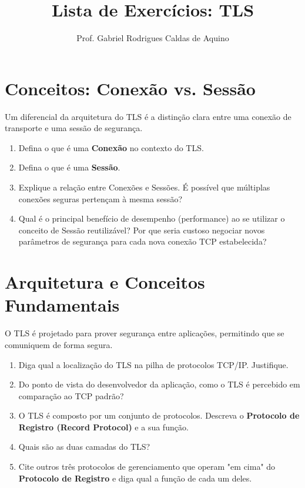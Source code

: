     \title{Lista de Exercícios: TLS}
        \author{Prof. Gabriel Rodrigues Caldas de Aquino}



\maketitle

\section{Conceitos: Conexão vs. Sessão}
Um diferencial da arquitetura do TLS é a distinção clara entre uma conexão de transporte e uma sessão de segurança.

\begin{enumerate}
    \item Defina o que é uma \textbf{Conexão} no contexto do TLS.
    \item Defina o que é uma \textbf{Sessão}.
    \item Explique a relação entre Conexões e Sessões. É possível que múltiplas conexões seguras pertençam à mesma sessão?
    \item Qual é o principal benefício de desempenho (performance) ao se utilizar o conceito de Sessão reutilizável? Por que seria custoso negociar novos parâmetros de segurança para cada nova conexão TCP estabelecida?
\end{enumerate}


\section{Arquitetura e Conceitos Fundamentais}
O TLS é projetado para prover segurança entre aplicações, permitindo que se comuniquem de forma segura.

\begin{enumerate}
    \item Diga qual a localização do TLS na pilha de protocolos TCP/IP. Justifique.
    \item Do ponto de vista do desenvolvedor da aplicação, como o TLS é percebido em comparação ao TCP padrão?
    \item O TLS é composto por um conjunto de protocolos. Descreva o \textbf{Protocolo de Registro (Record Protocol)} e a sua função.
    \item Quais são as duas camadas do TLS?
    \item Cite outros três protocolos de gerenciamento que operam "em cima" do \textbf{Protocolo de Registro} e diga qual a função de cada um deles.
\end{enumerate}

